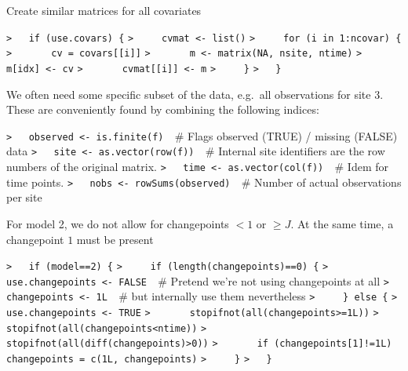 \documentclass[a4paper]{article}
\begin{document}
Create similar matrices for all covariates\par
\verb~>   if (use.covars) {~\newline
\verb~>     cvmat <- list()~\newline
\verb~>     for (i in 1:ncovar) {~\newline
\verb~>       cv = covars[[i]]~\newline
\verb~>       m <- matrix(NA, nsite, ntime)~\newline
\verb~>       m[idx] <- cv~\newline
\verb~>       cvmat[[i]] <- m~\newline
\verb~>     }~\newline
\verb~>   }~\par

We often need some specific subset of the data, e.g.\ all observations for site 3.
These are conveniently found by combining the following indices:\par
\verb~>   observed <- is.finite(f)  ~{\sffamily\# Flags observed (TRUE) / missing (FALSE) data}\newline
\verb~>   site <- as.vector(row(f))  ~{\sffamily\# Internal site identifiers are the row numbers of the original matrix.}\newline
\verb~>   time <- as.vector(col(f))  ~{\sffamily\# Idem for time points.}\newline
\verb~>   nobs <- rowSums(observed)  ~{\sffamily\# Number of actual observations per site}\par

For model 2, we do not allow for changepoints $<1$ or $\geq J$. At the same time,
a changepoint $1$ must be present\par
\verb~>   if (model==2) {~\newline
\verb~>     if (length(changepoints)==0) {~\newline
\verb~>       use.changepoints <- FALSE  ~{\sffamily\# Pretend we're not using changepoints at all}\newline
\verb~>       changepoints <- 1L  ~{\sffamily\# but internally use them nevertheless}\newline
\verb~>     } else {~\newline
\verb~>       use.changepoints <- TRUE~\newline
\verb~>       stopifnot(all(changepoints>=1L))~\newline
\verb~>       stopifnot(all(changepoints<ntime))~\newline
\verb~>       stopifnot(all(diff(changepoints)>0))~\newline
\verb~>       if (changepoints[1]!=1L) changepoints = c(1L, changepoints)~\newline
\verb~>     }~\newline
\verb~>   }~\par
\end{document}

